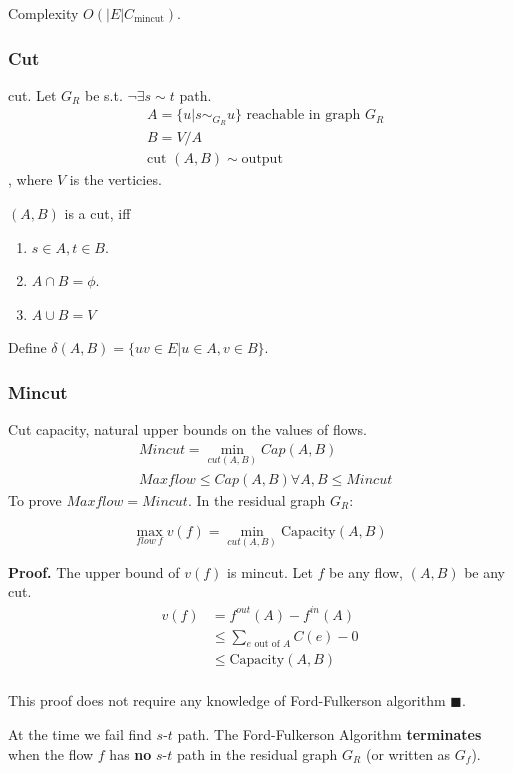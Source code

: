 \documentclass[a4paper]{report}
\begin{document}
Complexity $O(|E| C_{\text{mincut}})$. 
\subsubsection{Cut}
cut. Let $G_R$ be s.t. $\neg \exists s\sim t$ path. 
\begin{align*}
& A = \{u| s\sim_{G_R} u\} \text{ reachable in graph $G_R$}\\
& B = V/A\\
& \text{cut } (A, B) \sim \text{output}
\end{align*}
, where $V$ is the verticies. 

$(A, B)$ is a cut, iff 
\begin{enumerate}
\item $s\in A, t\in B$. 
\item $A\cap B = \phi$. 
\item $A\cup B = V$
\end{enumerate}
Define $\delta(A,B)=\{uv\in E| u\in A, v\in B\}$. 

\subsubsection{Mincut}
Cut capacity, natural upper bounds on the values of flows.
\begin{align*}
& Mincut = \min_{cut(A,B)} Cap(A, B)\\
& Maxflow \leq Cap(A, B) \forall A, B \leq Mincut
\end{align*}
To prove $Maxflow = Mincut$. In the residual graph $G_R$:

$$
\max_{flow~f} v(f) = \min_{cut(A, B)} \text{Capacity}(A,B)
$$

\textbf{Proof.} The upper bound of $v(f)$ is mincut. Let $f$ be any flow, $(A,B)$ be any cut. 
\begin{align*}
v(f) &= f^{out}(A)-f^{in}(A) \\
&\leq \sum_{e \text{ out of }A}C(e) - 0\\
&\leq \text{Capacity}(A, B) \\
\end{align*}

This proof does not require any knowledge of Ford-Fulkerson algorithm $\blacksquare$. 

At the time we fail find $s$-$t$ path. The Ford-Fulkerson Algorithm \textbf{terminates} when the flow $f$ has \textbf{no} $s$-$t$ path in the residual graph $G_R$ (or written as $G_f$). 
\end{document}
